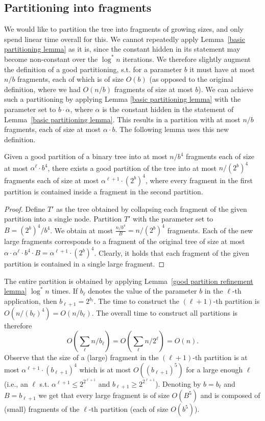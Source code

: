 \documentclass[a4paper,UKenglish]{lipics-v2016}
\theoremstyle{plain}
\begin{document}
\subsection{Partitioning into fragments}\label{section:partioioning}
We would like to partition the tree into fragments of growing sizes, and only spend linear time overall for this. We cannot repeatedly apply Lemma~\ref{basic partitioning lemma} as it is, since the constant hidden in its statement may become non-constant over the $\log^*n$ iterations. We therefore slightly augment the definition of a good partitioning, s.t. for a parameter $b$ it must have at most $n/b$ fragments, each of which is of size $O(b)$ (as opposed to the original definition, where we had $O(n/b)$ fragments of size at most $b$). We can achieve such a partitioning by applying Lemma \ref{basic partitioning lemma} with the parameter set to $b \cdot \alpha$, where $\alpha$ is the constant hidden in the statement of Lemma~\ref{basic partitioning lemma}. This results in a partition with at most $n/b$ fragments, each of size at most $\alpha \cdot b$. The following lemma uses this new definition.


\begin{lemma}\label{good partition refinement lemma}
Given a good partition of a binary tree into at most $n/b^{4}$ fragments each of size at most $\alpha^{\ell}\cdot b^{4}$, there
exists a good partition of the tree into at most $n/(2^b)^{4}$ fragments each of size at most $\alpha^{\ell+1}\cdot (2^{b})^{4}$,
where every fragment in the first partition is contained inside a fragment in the second partition.
\end{lemma}
\begin{proof}
Define $T'$ as the tree obtained by collapsing each fragment of the given partition into a single node. Partition $T'$ with the parameter set to $B= {(2^{b})^{4}}/{b^{4}}$. We obtain at most $\frac{n/b^4}{B}=n/(2^{b})^{4}$ fragments. Each of the new large fragments corresponds to a fragment of the original tree of size at most $\alpha\cdot \alpha^{\ell}\cdot b^{4}\cdot B = \alpha^{\ell+1}\cdot (2^{b})^{4}$. Clearly, it holds that each fragment of the given partition is contained in a single large fragment.
\end{proof}

\noindent The entire partition is obtained by applying Lemma~\ref{good partition refinement lemma} $\log^{*}n$ times. 
If $b_{\ell}$ denotes the value of the parameter $b$ in the $\ell$-th application, then  $b_{\ell+1}=2^{b_{\ell}}$. The time to construct the $(\ell+1)$-th partition is $O(n/(b_{\ell})^{4})=O(n/b_{\ell})$. The overall time to construct all partitions is therefore 
$$ O(\sum_{\ell} {n}/{b_{\ell}}) = O(\sum_{\ell} {n}/{2^{\ell}}) = O(n).$$
Observe that the size of a (large) fragment in the $(\ell+1)$-th partition is at most $\alpha^{\ell+1} \cdot (b_{\ell+1})^{4}$ which is at most $O((b_{\ell+1})^5)$ for a large enough $\ell$ (i.e., an $\ell$ s.t. $\alpha^{\ell+1}\leq 2^{2^{\ell+1}}$ and $b_{\ell+1}\geq 2^{2^{\ell+1}}$).  Denoting by $b=b_{\ell}$ and $B=b_{\ell+1}$  we get that every large fragment is of size $O(B^5)$ and is composed of (small) fragments of the $\ell$-th partition (each of size $O(b^5)$). 
\end{document}
